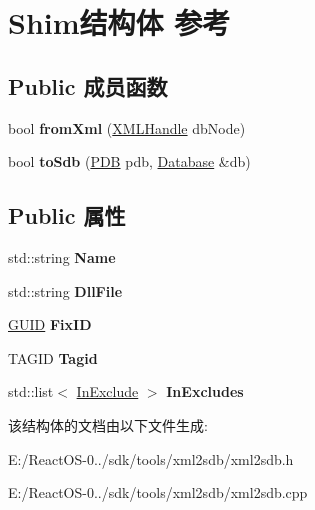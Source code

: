 \hypertarget{struct_shim}{}\section{Shim结构体 参考}
\label{struct_shim}
\subsection*{Public 成员函数}
\begin{DoxyCompactItemize}
\item 
\mbox{\label{struct_shim_a6b4c78c1422b4da743917d88ada263e9}} 
bool {\bfseries from\+Xml} (\hyperlink{classtinyxml2_1_1_x_m_l_handle}{X\+M\+L\+Handle} db\+Node)
\item 
\mbox{\label{struct_shim_a9b1bd421655bc1c094b4746e1af10428}} 
bool {\bfseries to\+Sdb} (\hyperlink{struct___d_b}{P\+DB} pdb, \hyperlink{struct_database}{Database} \&db)
\end{DoxyCompactItemize}
\subsection*{Public 属性}
\begin{DoxyCompactItemize}
\item 
\mbox{\label{struct_shim_adce3dcc2e9e7286bf03b51a2abc34f6a}} 
std\+::string {\bfseries Name}
\item 
\mbox{\label{struct_shim_a3cf53fa9dd546e511297b26eb85babbb}} 
std\+::string {\bfseries Dll\+File}
\item 
\mbox{\label{struct_shim_a03678008c0c3bde04dfec55a79f42fb9}} 
\hyperlink{interface_g_u_i_d}{G\+U\+ID} {\bfseries Fix\+ID}
\item 
\mbox{\label{struct_shim_a63e6c3ae57125fa352bc987ffc9fb43c}} 
T\+A\+G\+ID {\bfseries Tagid}
\item 
\mbox{\label{struct_shim_a2804b11dec00b9fe84f4b31858efdc7f}} 
std\+::list$<$ \hyperlink{struct_in_exclude}{In\+Exclude} $>$ {\bfseries In\+Excludes}
\end{DoxyCompactItemize}


该结构体的文档由以下文件生成\+:\begin{DoxyCompactItemize}
\item 
E\+:/\+React\+O\+S-\/0../sdk/tools/xml2sdb/xml2sdb.\+h\item 
E\+:/\+React\+O\+S-\/0../sdk/tools/xml2sdb/xml2sdb.\+cpp\end{DoxyCompactItemize}
